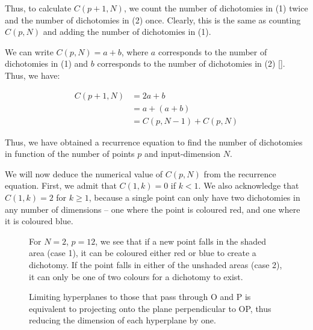 Thus, to calculate $C(p+1, N)$, we count the number of dichotomies in (1) twice and the number of dichotomies in (2) once. Clearly, this is the same as counting $C(p, N)$ and adding the number of dichotomies in (1).

We can write $C(p, N) = a + b$, where $a$ corresponds to the number of dichotomies in (1) and $b$ corresponds to the number of dichotomies in (2) []. Thus, we have:

\begin{align}
    C(p+1, N) & = 2a + b \nonumber \\
    & = a + (a + b) \nonumber \\
    & = C(p, N-1) + C(p, N)
\end{align}

Thus, we have obtained a recurrence equation to find the number of dichotomies in function of the number of points $p$ and input-dimension $N$.

We will now deduce the numerical value of $C(p, N)$ from the recurrence equation. First, we admit that $C(1, k) = 0$ if $k < 1$. We also acknowledge that $C(1, k) = 2$ for $k \geqslant 1$, because a single point can only have two dichotomies in any number of dimensions -- one where the point is coloured red, and one where it is coloured blue.

\pagebreak

\begin{figure}[bhtp]
    \centering
    \captionsetup{justification=centering, font=small, margin=0.5cm}
    \caption{For $N=2$, $p=12$, we see that if a new point falls in the shaded area (case 1), it can be coloured either red or blue to create a dichotomy. If the point falls in either of the unshaded areas (case 2), it can only be one of two colours for a dichotomy to exist.}
\end{figure}

\begin{figure}[bhtp]
    \centering
    \captionsetup{justification=centering, font=small, margin=0.5cm}
    \caption{Limiting hyperplanes to those that pass through O and P is equivalent to projecting onto the plane perpendicular to OP, thus reducing the dimension of each hyperplane by one. \cite[p.113]{introbook}}
\end{figure}

